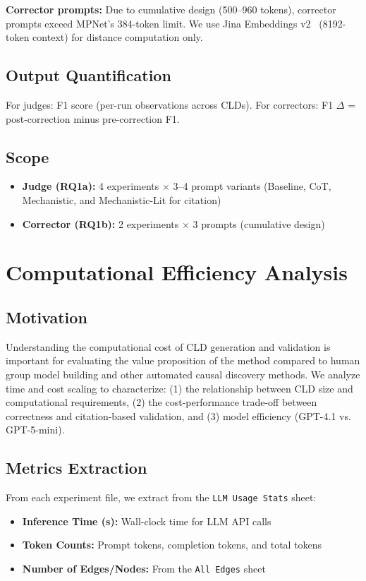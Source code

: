 \textbf{Corrector prompts:} Due to cumulative design (500--960 tokens), corrector prompts exceed MPNet's 384-token limit. We use Jina Embeddings v2~\cite{gunther2023jina} (8192-token context) for distance computation only.

\subsection{Output Quantification}
For judges: F1 score (per-run observations across CLDs). For correctors: F1 $\Delta$ = post-correction minus pre-correction F1.

\subsection{Scope}
\begin{itemize}[noitemsep]
    \item \textbf{Judge (RQ1a):} 4 experiments $\times$ 3--4 prompt variants (Baseline, CoT, Mechanistic, and Mechanistic-Lit for citation)
    \item \textbf{Corrector (RQ1b):} 2 experiments $\times$ 3 prompts (cumulative design)
\end{itemize}

\section{Computational Efficiency Analysis}

\subsection{Motivation}
Understanding the computational cost of CLD generation and validation is important for evaluating the value proposition of the method compared to human group model building and other automated causal discovery methods. We analyze time and cost scaling to characterize: (1) the relationship between CLD size and computational requirements, (2) the cost-performance trade-off between correctness and citation-based validation, and (3) model efficiency (GPT-4.1 vs. GPT-5-mini).

\subsection{Metrics Extraction}
From each experiment file, we extract from the \texttt{LLM Usage Stats} sheet:
\begin{itemize}[noitemsep]
    \item \textbf{Inference Time (s):} Wall-clock time for LLM API calls
    \item \textbf{Token Counts:} Prompt tokens, completion tokens, and total tokens
    \item \textbf{Number of Edges/Nodes:} From the \texttt{All Edges} sheet
\end{itemize}


